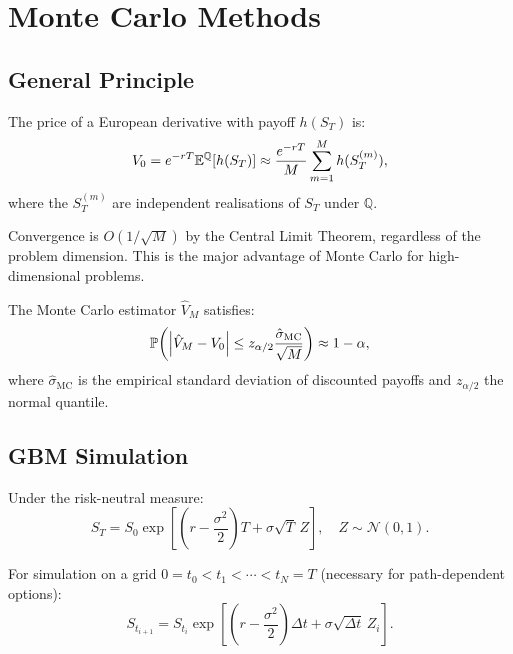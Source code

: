 \section{Monte Carlo Methods}

\subsection{General Principle}

\begin{theorem}
The price of a European derivative with payoff $h(S_T)$ is:
\[
    V_0 = e^{-rT}\mathbb{E}^\mathbb{Q}[h(S_T)]
        \approx \frac{e^{-rT}}{M}\sum_{m=1}^{M} h(S_T^{(m)}),
\]
where the $S_T^{(m)}$ are independent realisations of $S_T$ under
$\mathbb{Q}$.
\end{theorem}

Convergence is $O(1/\sqrt{M})$ by the Central Limit Theorem, regardless
of the problem dimension. This is the major advantage of Monte Carlo for
high-dimensional problems.

\begin{proposition}
The Monte Carlo estimator $\hat{V}_M$ satisfies:
\[
    \mathbb{P}\!\left(\left| \hat{V}_M - V_0 \right| \leq z_{\alpha/2}
    \frac{\hat{\sigma}_{\text{MC}}}{\sqrt{M}}\right) \approx 1 - \alpha,
\]
where $\hat{\sigma}_{\text{MC}}$ is the empirical standard deviation of
discounted payoffs and $z_{\alpha/2}$ the normal quantile.
\end{proposition}

\subsection{GBM Simulation}

Under the risk-neutral measure:
\[
    S_T = S_0 \exp\!\left[\left(r - \frac{\sigma^2}{2}\right)T
          + \sigma\sqrt{T}\,Z\right], \quad Z \sim \mathcal{N}(0,1).
\]

For simulation on a grid $0 = t_0 < t_1 < \cdots < t_N = T$ (necessary
for path-dependent options):
\[
    S_{t_{i+1}} = S_{t_i} \exp\!\left[\left(r - \frac{\sigma^2}{2}\right)
    \Delta t + \sigma\sqrt{\Delta t}\,Z_i\right].
\]

